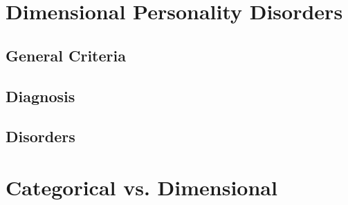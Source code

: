 \documentclass[xcolor=x11names,compress]{beamer}\usepackage[]{graphicx}\usepackage[]{color}
\renewcommand{\(}{\begin{columns}}
\renewcommand{\)}{\end{columns}}
\newcommand{\<}[1]{\begin{column}{#1}}
\renewcommand{\>}{\end{column}}
\begin{document}






\section{Dimensional Personality Disorders}
\subsection{General Criteria}


\subsection{Diagnosis}


\subsection{Disorders}


\section{Categorical vs. Dimensional}
\end{document}
